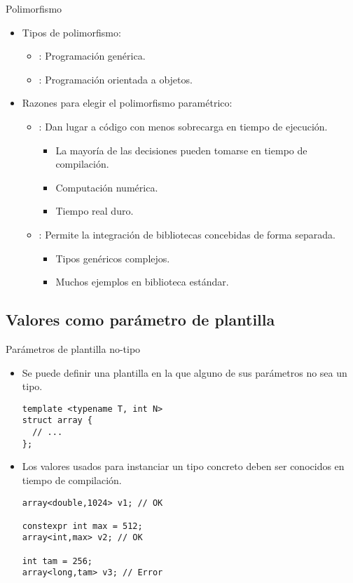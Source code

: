\begin{frame}{Polimorfismo}
\begin{itemize}
  \item Tipos de polimorfismo:
    \begin{itemize}
      \item {}: Programación genérica.
      \item {}: Programación orientada a objetos.
    \end{itemize}
  \item Razones para elegir el polimorfismo paramétrico:
    \begin{itemize}
      \item {}: Dan lugar a código con menos sobrecarga 
            en tiempo de ejecución.
        \begin{itemize}
          \item La mayoría de las decisiones pueden tomarse en tiempo de compilación.
          \item Computación numérica.
          \item Tiempo real duro.
        \end{itemize}
 
      \item {}: Permite la integración de bibliotecas concebidas 
            de forma separada.
        \begin{itemize}
          \item Tipos genéricos complejos.
          \item Muchos ejemplos en biblioteca estándar.
        \end{itemize}
    \end{itemize}
\end{itemize}
\end{frame}

\subsection{Valores como parámetro de plantilla}

\begin{frame}[fragile]{Parámetros de plantilla no-tipo}
\begin{itemize}
  \item Se puede definir una plantilla en la que alguno de sus parámetros no sea
        un tipo.
\begin{lstlisting}
template <typename T, int N>
struct array {
  // ...
};
\end{lstlisting}
  \item Los valores usados para instanciar un tipo concreto deben ser conocidos en
        tiempo de compilación.
\begin{lstlisting}
array<double,1024> v1; // OK

constexpr int max = 512;
array<int,max> v2; // OK

int tam = 256;
array<long,tam> v3; // Error
\end{lstlisting}
\end{itemize}
\end{frame}

